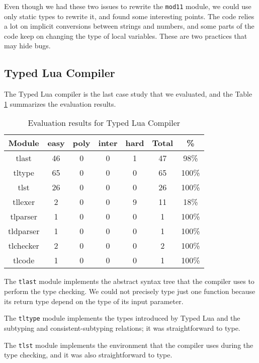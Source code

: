 Even though we had these two issues to rewrite the \texttt{mod11} module,
we could use only static types to rewrite it, and found some interesting
points.
The code relies a lot on implicit conversions between strings and numbers,
and some parts of the code keep on changing the type of local variables.
These are two practices that may hide bugs.

\subsection{Typed Lua Compiler}

The Typed Lua compiler is the last case study that we evaluated, and the
Table \ref{tab:evaltlc} summarizes the evaluation results.

\begin{table}[!ht]
\begin{center}
\begin{tabular}{|c|c|c|c|c|c|c|}
\hline
\textbf{Module} & \textbf{easy} & \textbf{poly} & \textbf{inter} & \textbf{hard} & \textbf{Total} & \textbf{\%} \\
\hline
tlast & 46 & 0 & 0 & 1 & 47 & 98\% \\
\hline
tltype & 65 & 0 & 0 & 0 & 65 & 100\% \\
\hline
tlst & 26 & 0 & 0 & 0 & 26 & 100\% \\
\hline
tllexer & 2 & 0 & 0 & 9 & 11 & 18\% \\
\hline
tlparser & 1 & 0 & 0 & 0 & 1 & 100\% \\
\hline
tldparser & 1 & 0 & 0 & 0 & 1 & 100\% \\
\hline
tlchecker & 2 & 0 & 0 & 0 & 2 & 100\% \\
\hline
tlcode & 1 & 0 & 0 & 0 & 1 & 100\% \\
\hline
\end{tabular}
\end{center}
\caption{Evaluation results for Typed Lua Compiler}
\label{tab:evaltlc}
\end{table}

The \texttt{tlast} module implements the abstract syntax tree that
the compiler uses to perform the type checking.
We could not precisely type just one function because its return
type depend on the type of its input parameter.

The \texttt{tltype} module implements the types introduced by
Typed Lua and the subtyping and consistent-subtyping relations;
it was straightforward to type.

The \texttt{tlst} module implements the environment that the
compiler uses during the type checking, and it was also straightforward
to type.

